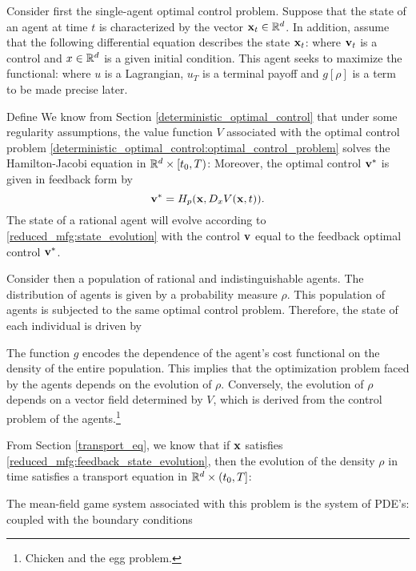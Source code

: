 \documentclass{article}
\begin{document}
Consider first the single-agent optimal control problem. Suppose that the state of an agent at time $t$ is characterized by the vector ${\bf x}_t \in \mathbb{R}^d$. In addition, assume that the following differential equation describes the state ${\bf x}_t$:
where ${\bf v}_t$ is a control and $x\in\mathbb{R}^d$ is a given initial condition. This agent seeks to maximize the functional:
where $u$ is a Lagrangian, $u_T$ is a terminal payoff and $g[\rho]$ is a term to be made precise later. 

Define
We know from Section \eqref{deterministic_optimal_control} that under some regularity assumptions, the value function $V$ associated with the optimal control problem \eqref{deterministic_optimal_control:optimal_control_problem} 
solves the Hamilton-Jacobi equation in $\mathbb{R}^d \times [t_0,T)$:
Moreover, the optimal control ${\bf v}^*$ is given in feedback form by
$${\bf v}^* = H_p({\bf x}, D_x V({\bf x}, t)).$$
The state of a rational agent will evolve according to \eqref{reduced_mfg:state_evolution} with the control ${\bf v}$ equal to the feedback optimal control ${\bf v}^*$.

Consider then a population of rational and indistinguishable agents. The distribution of agents is given by a probability measure $\rho$. This population of agents is subjected to the same optimal control problem. Therefore, the state of each individual is driven by

The function $g$ encodes the dependence of the agent's cost functional on the density of the entire population. This implies that the optimization problem faced by the agents depends on the evolution of $\rho$. Conversely, the evolution of $\rho$ depends on a vector field determined by $V$, which is derived from the control problem of the agents.\footnote{Chicken and the egg problem.}

From Section \eqref{transport_eq}, we know that if ${\bf x}$ satisfies \eqref{reduced_mfg:feedback_state_evolution}, then the evolution of the density $\rho$ in time satisfies a transport equation in $\mathbb{R}^d \times (t_0, T]$:

The mean-field game system associated with this problem is the system of PDE's:
coupled with the boundary conditions
\end{document}
